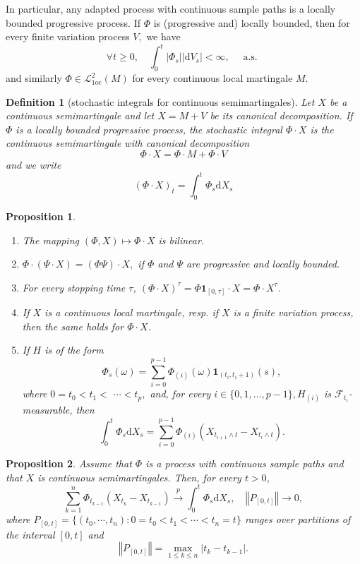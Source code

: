 \documentclass{article}
\newtheorem{definition}{Definition}[section]
\newtheorem{proposition}{Proposition}[section]
\theoremstyle{nonumberplain}
\begin{document}
In particular, any adapted process with continuous sample paths is a locally bounded progressive process. If $\Phi$ is (progressive and) locally bounded, then for every finite variation process $V,$ we have
\[
\forall t \geq 0, \quad \int_{0}^{t}\left|\Phi_{s}\right|\left|\mathrm{d} V_{s}\right|<\infty, \quad \text { a.s. }
\]
and similarly $\Phi \in \mathscr{L}_{1 \mathrm{oc}}^{2}(M)$ for every continuous local martingale $M$.

\begin{definition}[stochastic integrals for continuous semimartingales]
	Let $X$ be a continuous semimartingale and let $X=M+V$ be its canonical decomposition. If $\Phi$ is a locally bounded progressive process, the stochastic integral $\Phi \cdot X$ is the continuous semimartingale with canonical decomposition
	\[
	\Phi \cdot X=\Phi \cdot M+\Phi \cdot V
	\]
	and we write
	\[
	(\Phi \cdot X)_{t}=\int_{0}^{t} \Phi_{s} \mathrm{d} X_{s}
	\]
\end{definition}


\begin{proposition}
	\begin{enumerate}
		\item The mapping $(\Phi, X) \mapsto \Phi \cdot X$ is bilinear.
		\item $\Phi \cdot(\Psi \cdot X)=(\Phi \Psi) \cdot X,$ if $\Phi$ and $\Psi$ are progressive and locally bounded.
		\item For every stopping time $\tau$, $(\Phi \cdot X)^{\tau}=\Phi \mathbf{1}_{[0, \tau]} \cdot X=\Phi \cdot X^{\tau}$.
		\item If $X$ is a continuous local martingale, resp. if $X$ is a finite variation process, then the same holds for $\Phi \cdot X$.
		\item If $H$ is of the form 
		$$
		\Phi_{s}(\omega)=\sum_{i=0}^{p-1} \Phi_{(i)}(\omega) \mathbf{1}_{\left(t_{i}, t_{i}+1\right)}(s),
		$$
		where $0=t_{0}<t_{1}<$
		$\cdots<t_{p},$ and, for every $i \in\{0,1, \ldots, p-1\}, H_{(i)}$ is $\mathcal{F}_{t_{i}}$-measurable, then
		\[
		\int_{0}^{t} \Phi_{s} \mathrm{d} X_{s}=\sum_{i=0}^{p-1} \Phi_{(i)}\left(X_{t_{i+1} \wedge t}-X_{t_{i} \wedge t}\right).
		\]
	\end{enumerate}
\end{proposition}


\begin{proposition}
	Assume that $\Phi$ is a process with continuous sample paths and that $X$ is continuous semimartingales. Then, for every $t>0$,
	\[
	\sum_{k=1}^{n} \Phi_{t_{k-1}}\left(X_{t_{k}}-X_{t_{k-1}}\right)\stackrel{p}{\longrightarrow}\int_{0}^{t} \Phi_{s} \mathrm{d} X_{s},\quad\left\Vert P_{[0,t]}\right\Vert \longrightarrow 0,
	\]
	where $P_{[0,t]}=\{(t_0,\cdots,t_n):0=t_0<t_1<\cdots<t_n=t\}$ ranges over partitions of the interval $[0,t]$ and 
	\[
	\left\Vert P_{[0,t]}\right\Vert=\max\limits_{1\le k\le n}{|t_k-t_{k-1}|}.
	\]
\end{proposition}
\end{document}
